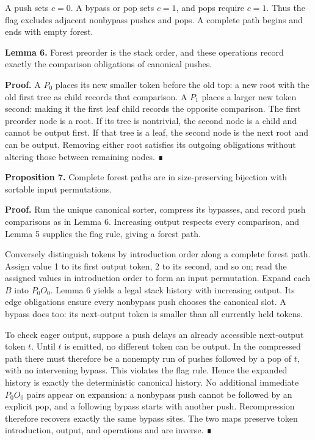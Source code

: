 \documentclass[11pt,letterpaper]{article}
\begin{document}
A push sets \(c=0\). A bypass or pop sets \(c=1\), and pops require
\(c=1\). Thus the flag excludes adjacent nonbypass pushes and pops. A
complete path begins and ends with empty forest.

\textbf{Lemma 6.} Forest preorder is the stack order, and these
operations record exactly the comparison obligations of canonical
pushes.

\textbf{Proof.} A \(P_0\) places its new smaller token before the old
top: a new root with the old first tree as child records that
comparison. A \(P_1\) places a larger new token second: making it the
first leaf child records the opposite comparison. The first preorder
node is a root. If its tree is nontrivial, the second node is a child
and cannot be output first. If that tree is a leaf, the second node is
the next root and can be output. Removing either root satisfies its
outgoing obligations without altering those between remaining nodes. ∎

\textbf{Proposition 7.} Complete forest paths are in size-preserving
bijection with sortable input permutations.

\textbf{Proof.} Run the unique canonical sorter, compress its bypasses,
and record push comparisons as in Lemma 6. Increasing output respects
every comparison, and Lemma 5 supplies the flag rule, giving a forest
path.

Conversely distinguish tokens by introduction order along a complete
forest path. Assign value 1 to its first output token, 2 to its second,
and so on; read the assigned values in introduction order to form an
input permutation. Expand each \(B\) into \(P_0O_0\). Lemma 6 yields a
legal stack history with increasing output. Its edge obligations ensure
every nonbypass push chooses the canonical slot. A bypass does too: its
next-output token is smaller than all currently held tokens.

To check eager output, suppose a push delays an already accessible
next-output token \(t\). Until \(t\) is emitted, no different token can
be output. In the compressed path there must therefore be a nonempty run
of pushes followed by a pop of \(t\), with no intervening bypass. This
violates the flag rule. Hence the expanded history is exactly the
deterministic canonical history. No additional immediate \(P_0O_0\)
pairs appear on expansion: a nonbypass push cannot be followed by an
explicit pop, and a following bypass starts with another push.
Recompression therefore recovers exactly the same bypass sites. The two
maps preserve token introduction, output, and operations and are
inverse. ∎
\end{document}
